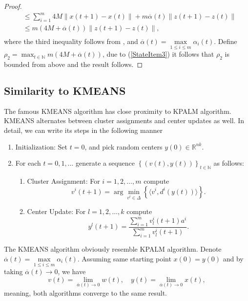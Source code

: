 \documentclass[11pt]{article}
\numberwithin{equation}{section}
\begin{document}
\begin{proof}
\begin{equation*}
\begin{aligned}
	& \leq \sum\limits_{i=1}^{m} 4M \| x(t+1) - x(t) \| + m \overline{\alpha}(t) \|z(t+1) - z(t)\| \\
	& \leq m \left( 4M + \overline{\alpha}(t) \right) \|z(t+1) - z(t)\| , \\
\end{aligned}
\end{equation*}
where the third inequality follows from , and $\overline{\alpha}(t) = \max\limits_{1 \leq i \leq m} \alpha_i(t)$. Define \\$\rho_2 = \max_{t\in \mathbb{N}} m \left( 4M + \overline{\alpha}(t) \right)$, due to (\ref{StateItem3}) it follows that $\rho_2$ is bounded from above and the result follows.
\end{proof}


\subsection{Similarity to KMEANS}
The famous KMEANS algorithm has close proximity to KPALM algorithm. KMEANS alternates between cluster assignments and center updates as well. In detail, we can write its steps in the following manner

\begin{enumerate}[(1)]
	\item Initialization: Set $t=0$, and pick random centers $y(0) \in \mathbb{R}^{nk}$.

	\item For each $t=0,1, \ldots$ generate a sequence $\left\lbrace(v(t),y(t))\right\rbrace_{t \in \mathbb{N}}$ as follows:
	\begin{enumerate}[(2.1)]
		\item Cluster Assignment: For $i=1, 2, \ldots ,m$ compute
		\begin{equation}
			v^i(t+1) = \arg\min\limits_{v^i \in \Delta} \left\lbrace \langle v^i , d^i(y(t)) \rangle\right\rbrace . \label{StateEq12}
		\end{equation}
		
		\item Center Update: For $l=1, 2, \ldots ,k$ compute
		\begin{equation}
			y^l(t+1) = \frac{\sum_{i=1}^{m} v^i_l(t+1) a^i}{\sum_{i=1}^{m} v^i_l(t+1)} . \label{StateEq13}
		\end{equation}
	\end{enumerate}
\end{enumerate}
The KMEANS algorithm obviously resemble KPALM algorithm. Denote $\overline{\alpha}(t) = \max\limits_{1 \leq i \leq m} \alpha_i(t)$. Assuming same starting point $x(0) = y(0)$ and by taking $\overline{\alpha}(t) \to 0$, we have
\begin{equation*}
	v(t) = \lim_{\overline{\alpha}(t) \to 0} w(t), \quad
	y(t) = \lim_{\overline{\alpha}(t) \to 0} x(t),
\end{equation*}
meaning, both algorithms converge to the same result.
\end{document}
